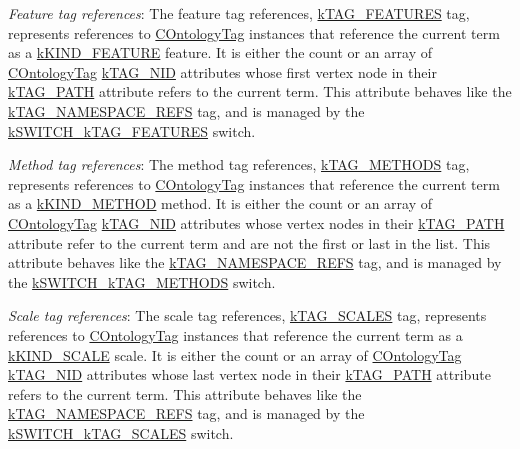 {\begin{DoxyItemize}
\item {\itshape Feature tag references}\-: The feature tag references, {\ttfamily \hyperlink{}{k\-T\-A\-G\-\_\-\-F\-E\-A\-T\-U\-R\-E\-S}} tag, represents references to \hyperlink{class_c_ontology_tag}{C\-Ontology\-Tag} instances that reference the current term as a \hyperlink{}{k\-K\-I\-N\-D\-\_\-\-F\-E\-A\-T\-U\-R\-E} feature. It is either the count or an array of \hyperlink{class_c_ontology_tag}{C\-Ontology\-Tag} \hyperlink{}{k\-T\-A\-G\-\_\-\-N\-I\-D} attributes whose first vertex node in their \hyperlink{}{k\-T\-A\-G\-\_\-\-P\-A\-T\-H} attribute refers to the current term. This attribute behaves like the {\ttfamily \hyperlink{}{k\-T\-A\-G\-\_\-\-N\-A\-M\-E\-S\-P\-A\-C\-E\-\_\-\-R\-E\-F\-S}} tag, and is managed by the \hyperlink{}{k\-S\-W\-I\-T\-C\-H\-\_\-k\-T\-A\-G\-\_\-\-F\-E\-A\-T\-U\-R\-E\-S} switch. 
\item {\itshape Method tag references}\-: The method tag references, {\ttfamily \hyperlink{}{k\-T\-A\-G\-\_\-\-M\-E\-T\-H\-O\-D\-S}} tag, represents references to \hyperlink{class_c_ontology_tag}{C\-Ontology\-Tag} instances that reference the current term as a \hyperlink{}{k\-K\-I\-N\-D\-\_\-\-M\-E\-T\-H\-O\-D} method. It is either the count or an array of \hyperlink{class_c_ontology_tag}{C\-Ontology\-Tag} \hyperlink{}{k\-T\-A\-G\-\_\-\-N\-I\-D} attributes whose vertex nodes in their \hyperlink{}{k\-T\-A\-G\-\_\-\-P\-A\-T\-H} attribute refer to the current term and are not the first or last in the list. This attribute behaves like the {\ttfamily \hyperlink{}{k\-T\-A\-G\-\_\-\-N\-A\-M\-E\-S\-P\-A\-C\-E\-\_\-\-R\-E\-F\-S}} tag, and is managed by the \hyperlink{}{k\-S\-W\-I\-T\-C\-H\-\_\-k\-T\-A\-G\-\_\-\-M\-E\-T\-H\-O\-D\-S} switch. 
\item {\itshape Scale tag references}\-: The scale tag references, {\ttfamily \hyperlink{}{k\-T\-A\-G\-\_\-\-S\-C\-A\-L\-E\-S}} tag, represents references to \hyperlink{class_c_ontology_tag}{C\-Ontology\-Tag} instances that reference the current term as a \hyperlink{}{k\-K\-I\-N\-D\-\_\-\-S\-C\-A\-L\-E} scale. It is either the count or an array of \hyperlink{class_c_ontology_tag}{C\-Ontology\-Tag} \hyperlink{}{k\-T\-A\-G\-\_\-\-N\-I\-D} attributes whose last vertex node in their \hyperlink{}{k\-T\-A\-G\-\_\-\-P\-A\-T\-H} attribute refers to the current term. This attribute behaves like the {\ttfamily \hyperlink{}{k\-T\-A\-G\-\_\-\-N\-A\-M\-E\-S\-P\-A\-C\-E\-\_\-\-R\-E\-F\-S}} tag, and is managed by the \hyperlink{}{k\-S\-W\-I\-T\-C\-H\-\_\-k\-T\-A\-G\-\_\-\-S\-C\-A\-L\-E\-S} switch. 
\end{DoxyItemize}}

